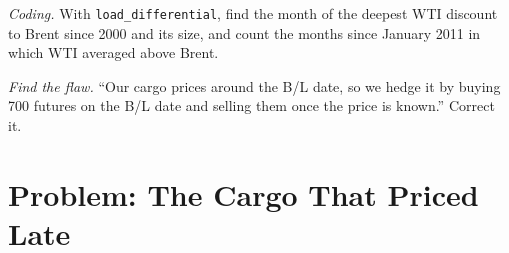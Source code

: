 \begin{exercise}[$\star\star\star$]\label{exo:m3:physical-commodity-markets:7}
\emph{Coding.} With \texttt{load\_differential}, find the month of the deepest WTI
discount to Brent since 2000 and its size, and count the months since January 2011
in which WTI averaged above Brent.
\end{exercise}

\begin{exercise}[$\star\star\star$]\label{exo:m3:physical-commodity-markets:8}
\emph{Find the flaw.} ``Our cargo prices around the B/L date, so we hedge it by
buying 700 futures on the B/L date and selling them once the price is known.''
Correct it.
\end{exercise}

\section{Problem: The Cargo That Priced Late}

